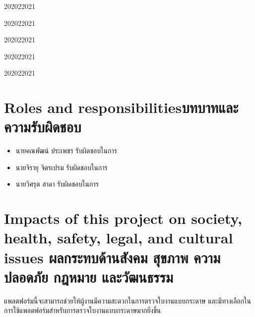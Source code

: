 \begin{plan}{6}{2020}{2}{2021}
\end{plan}

\begin{plan}{6}{2020}{2}{2021}
\end{plan}

\begin{plan}{6}{2020}{2}{2021}
\end{plan}

\begin{plan}{6}{2020}{2}{2021}
\end{plan}

\begin{plan}{6}{2020}{2}{2021}
\end{plan}

\section{\ifenglish Roles and responsibilities\else บทบาทและความรับผิดชอบ\fi}
    \begin{itemize}
        \item นายคณพัฒน์ ประเพชร รับผิดชอบในการ
        \item นายจิรายุ จิตรเปรม รับผิดชอบในการ
        \item นายวิศรุต สาดา รับผิดชอบในการ
    \end{itemize}

\section{\ifenglish%
Impacts of this project on society, health, safety, legal, and cultural issues
\else%
ผลกระทบด้านสังคม สุขภาพ ความปลอดภัย กฎหมาย และวัฒนธรรม
\fi}
\qquad แพลตฟอร์มนี้จะสามารถช่วยให้ผู้งานมีความสะดวกในการตรวจใบงานแบบกระดาษ และมีทางเลือกในการใช้แพลตฟอร์มสําหรับการตรวจใบงานแบบกระดาษมากยิ่งขึ้น